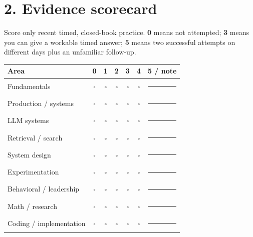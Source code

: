 \documentclass[10pt,letterpaper]{article}
\begin{document}
\section*{2. Evidence scorecard}
Score only recent timed, closed-book practice. \textbf{0} means not attempted; \textbf{3} means you can give a workable timed answer; \textbf{5} means two successful attempts on different days plus an unfamiliar follow-up.
\par
\vspace{.08in}
\renewcommand{\arraystretch}{1.35}
\begin{tabularx}{\linewidth}{@{}p{.31\linewidth} c c c c c X@{}}
\toprule
Area & 0 & 1 & 2 & 3 & 4 & 5 / note \\
\midrule
Fundamentals & $\square$ & $\square$ & $\square$ & $\square$ & $\square$ & \rule{.8\hsize}{.35pt} \\
Production / systems & $\square$ & $\square$ & $\square$ & $\square$ & $\square$ & \rule{.8\hsize}{.35pt} \\
LLM systems & $\square$ & $\square$ & $\square$ & $\square$ & $\square$ & \rule{.8\hsize}{.35pt} \\
Retrieval / search & $\square$ & $\square$ & $\square$ & $\square$ & $\square$ & \rule{.8\hsize}{.35pt} \\
System design & $\square$ & $\square$ & $\square$ & $\square$ & $\square$ & \rule{.8\hsize}{.35pt} \\
Experimentation & $\square$ & $\square$ & $\square$ & $\square$ & $\square$ & \rule{.8\hsize}{.35pt} \\
Behavioral / leadership & $\square$ & $\square$ & $\square$ & $\square$ & $\square$ & \rule{.8\hsize}{.35pt} \\
Math / research & $\square$ & $\square$ & $\square$ & $\square$ & $\square$ & \rule{.8\hsize}{.35pt} \\
Coding / implementation & $\square$ & $\square$ & $\square$ & $\square$ & $\square$ & \rule{.8\hsize}{.35pt} \\
\bottomrule
\end{tabularx}

\newpage
\end{document}
